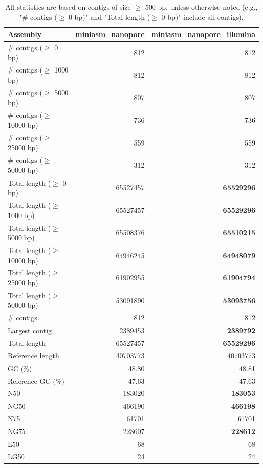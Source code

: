 \documentclass[12pt,a4paper]{article}
\begin{document}
\begin{table}[ht]
\begin{center}
\caption{All statistics are based on contigs of size $\geq$ 500 bp, unless otherwise noted (e.g., "\# contigs ($\geq$ 0 bp)" and "Total length ($\geq$ 0 bp)" include all contigs).}
\begin{tabular}{|l*{2}{|r}|}
\hline
Assembly & miniasm\_nanopore & miniasm\_nanopore\_illumina \\ \hline
\# contigs ($\geq$ 0 bp) & 812 & 812 \\ \hline
\# contigs ($\geq$ 1000 bp) & 812 & 812 \\ \hline
\# contigs ($\geq$ 5000 bp) & 807 & 807 \\ \hline
\# contigs ($\geq$ 10000 bp) & 736 & 736 \\ \hline
\# contigs ($\geq$ 25000 bp) & 559 & 559 \\ \hline
\# contigs ($\geq$ 50000 bp) & 312 & 312 \\ \hline
Total length ($\geq$ 0 bp) & 65527457 & {\bf 65529296} \\ \hline
Total length ($\geq$ 1000 bp) & 65527457 & {\bf 65529296} \\ \hline
Total length ($\geq$ 5000 bp) & 65508376 & {\bf 65510215} \\ \hline
Total length ($\geq$ 10000 bp) & 64946245 & {\bf 64948079} \\ \hline
Total length ($\geq$ 25000 bp) & 61902955 & {\bf 61904794} \\ \hline
Total length ($\geq$ 50000 bp) & 53091890 & {\bf 53093756} \\ \hline
\# contigs & 812 & 812 \\ \hline
Largest contig & 2389453 & {\bf 2389792} \\ \hline
Total length & 65527457 & {\bf 65529296} \\ \hline
Reference length & 40703773 & 40703773 \\ \hline
GC (\%) & 48.80 & 48.81 \\ \hline
Reference GC (\%) & 47.63 & 47.63 \\ \hline
N50 & 183020 & {\bf 183053} \\ \hline
NG50 & 466190 & {\bf 466198} \\ \hline
N75 & 61701 & 61701 \\ \hline
NG75 & 228607 & {\bf 228612} \\ \hline
L50 & 68 & 68 \\ \hline
LG50 & 24 & 24 \\ \hline

\end{tabular}
\end{center}
\end{table}
\end{document}
